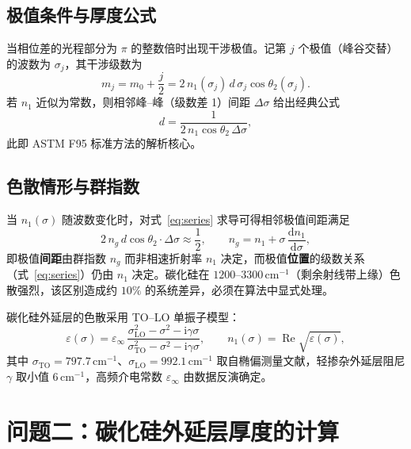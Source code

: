 \documentclass[11pt,a4paper,fontset=fandol]{ctexart}
\newcommand{\invcm}{\,\mathrm{cm^{-1}}}
\begin{document}
\subsection{极值条件与厚度公式}

当相位差的光程部分为 $\pi$ 的整数倍时出现干涉极值。记第 $j$ 个极值（峰谷交替）的波数为 $\sigma_j$，其干涉级数为
\begin{equation}
    m_j = m_0 + \frac{j}{2} = 2\,n_1(\sigma_j)\,d\,\sigma_j\cos\theta_2(\sigma_j).
    \label{eq:series}
\end{equation}
若 $n_1$ 近似为常数，则相邻峰--峰（级数差 1）间距 $\Delta\sigma$ 给出经典公式
\begin{equation}
    d = \frac{1}{2\,n_1\cos\theta_2\,\Delta\sigma},
    \label{eq:spacing}
\end{equation}
此即 ASTM F95 标准方法的解析核心\cite{astmf95}。

\subsection{色散情形与群指数}

当 $n_1(\sigma)$ 随波数变化时，对式~\eqref{eq:series} 求导可得相邻极值间距满足
\begin{equation}
    2\,n_g\,d\cos\theta_2\cdot\Delta\sigma \approx \frac{1}{2},
    \qquad
    n_g = n_1 + \sigma\,\frac{\mathrm{d}n_1}{\mathrm{d}\sigma},
    \label{eq:group}
\end{equation}
即极值\textbf{间距}由群指数 $n_g$ 而非相速折射率 $n_1$ 决定，而极值\textbf{位置}的级数关系（式~\eqref{eq:series}）仍由 $n_1$ 决定。碳化硅在 $1200\text{--}3300\invcm$（剩余射线带上缘）色散强烈，该区别造成约 $10\%$ 的系统差异，必须在算法中显式处理。

碳化硅外延层的色散采用 TO--LO 单振子模型\cite{spitzer1959,madan2024}：
\begin{equation}
    \varepsilon(\sigma) = \varepsilon_\infty\,
    \frac{\sigma_{\mathrm{LO}}^2-\sigma^2-\mathrm{i}\gamma\sigma}
         {\sigma_{\mathrm{TO}}^2-\sigma^2-\mathrm{i}\gamma\sigma},
    \qquad n_1(\sigma)=\operatorname{Re}\sqrt{\varepsilon(\sigma)},
    \label{eq:oscillator}
\end{equation}
其中 $\sigma_{\mathrm{TO}}=797.7\invcm$、$\sigma_{\mathrm{LO}}=992.1\invcm$ 取自椭偏测量文献\cite{madan2024}，轻掺杂外延层阻尼 $\gamma$ 取小值 $6\invcm$，高频介电常数 $\varepsilon_\infty$ 由数据反演确定。

\section{问题二：碳化硅外延层厚度的计算}
\end{document}
